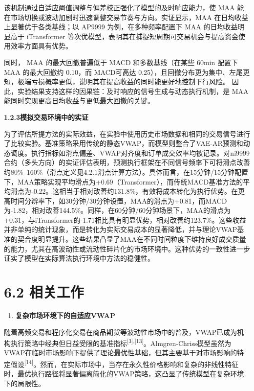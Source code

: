\documentclass[UTF8]{ctexart}
\begin{document}
该机制通过自适应阈值调整与偏差校正强化了模型的及时响应能力，使 MAA
能在市场切换或波动加剧时迅速调整交易节奏与方向。实证显示，MAA
在日均收益上显著优于各类基线；以 AP9999 为例，在多种频率配置下 MAA
的日均收益明显高于 iTransformer
等次优模型，表明其在捕捉短周期可交易机会与提高资金使用效率方面具有优势。

同时， MAA 的最大回撤普遍低于 MACD 和多数基线（在某些 60min 配置下 MAA
的最大回撤约 0.10，而 MACD可高达
0.25），且回撤分布更为集中、左尾更短，极端亏损概率更低，说明其在提高收益的同时能更好地控制下行风险。
因此，实验结果支持这样的因果链：及时响应的信号生成与动态执行机制，是 MAA
能同时实现更高日均收益与更低最大回撤的关键。

\textbf{1.2.3模拟交易环境中的实证}

为了评估所提方法的实际效益，在实验中使用历史市场数据和相同的交易信号进行了比较实验。基准策略采用传统的静态VWAP，而模型则整合了VAE-AR预测和动态调度。执行指标如滑点偏差、VWAP对齐度和订单成交效率均被记录。对ni9999合约（多头方向）的实证评估表明，预测执行框架在不同信号频率下可将滑点改善约80\%--160\%（滑点定义见4.2.1滑点计算方法）。具体而言，在15分钟/15分钟配置下，MAA策略实现平均滑点为+0.69（Transformer），而传统MACD基准方法的平均滑点为-0.22。这相当于相对改善约131.8\%，有效将成本转化为执行优势。在更高时间分辨率下，如30分钟/30分钟设置，MAA的滑点为+0.81，而MACD为-1.82，相对改善144.5\%。同样，在60分钟/60分钟场景下，MAA的滑点为+0.31，与iTransformer的-1.71相比具有明显优势，相对改善约123.7\%。这些收益并非单纯的统计现象，而是转化为实际交易成本的显著降低，并与理论VWAP基准的契合度明显提升。这些结果凸显了MAA在不同时间粒度下维持良好成交质量的能力，尤其在高波动性或流动性碎片化的市场环境中。这种优势的一致性进一步证实了模型在实际算法执行环境中方法的稳健性。

\section{6.2 相关工作}\label{ux76f8ux5173ux5de5ux4f5c-1}

\begin{enumerate}
\def\labelenumi{\arabic{enumi}.}
\item
  \textbf{复杂市场环境下的自适应VWAP}
\end{enumerate}

随着高频交易和程序化交易在商品期货等波动性市场中的普及，VWAP已成为机构执行策略中经典但日益受限的基准指标\textsuperscript{{[}3{]},{[}13{]}}。Almgren-Chriss模型虽然为VWAP在临时市场影响下提供了理论最优性基础，但其主要基于对市场影响的特定假设\textsuperscript{{[}14{]}}。然而，在实际市场中，当存在永久性价格影响和复杂的非线性特征时，最优执行路径将显著偏离简化的VWAP策略，这凸显了传统模型在复杂环境下的局限性。
\end{document}
